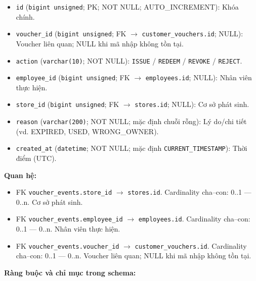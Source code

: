 \begin{itemize}

\item \texttt{id} (\texttt{bigint unsigned}; PK; NOT NULL; AUTO_INCREMENT): Khóa chính.

\item \texttt{voucher\_id} (\texttt{bigint unsigned}; FK $\rightarrow$ \texttt{customer\_vouchers.id}; NULL): Voucher liên quan; NULL khi mã nhập không tồn tại.

\item \texttt{action} (\texttt{varchar(10)}; NOT NULL): \texttt{ISSUE} / \texttt{REDEEM} / \texttt{REVOKE} / \texttt{REJECT}.

\item \texttt{employee\_id} (\texttt{bigint unsigned}; FK $\rightarrow$ \texttt{employees.id}; NULL): Nhân viên thực hiện.

\item \texttt{store\_id} (\texttt{bigint unsigned}; FK $\rightarrow$ \texttt{stores.id}; NULL): Cơ sở phát sinh.

\item \texttt{reason} (\texttt{varchar(200)}; NOT NULL; mặc định chuỗi rỗng): Lý do/chi tiết (vd. EXPIRED, USED, WRONG_OWNER).

\item \texttt{created\_at} (\texttt{datetime}; NOT NULL; mặc định \texttt{CURRENT\_TIMESTAMP}): Thời điểm (UTC).

\end{itemize}

\textbf{Quan hệ:}

\begin{itemize}

\item FK \texttt{voucher\_events.store\_id} $\rightarrow$ \texttt{stores.id}. Cardinality cha--con: 0..1 — 0..n. Cơ sở phát sinh.

\item FK \texttt{voucher\_events.employee\_id} $\rightarrow$ \texttt{employees.id}. Cardinality cha--con: 0..1 — 0..n. Nhân viên thực hiện.

\item FK \texttt{voucher\_events.voucher\_id} $\rightarrow$ \texttt{customer\_vouchers.id}. Cardinality cha--con: 0..1 — 0..n. Voucher liên quan; NULL khi mã nhập không tồn tại.

\end{itemize}

\textbf{Ràng buộc và chỉ mục trong schema:}

